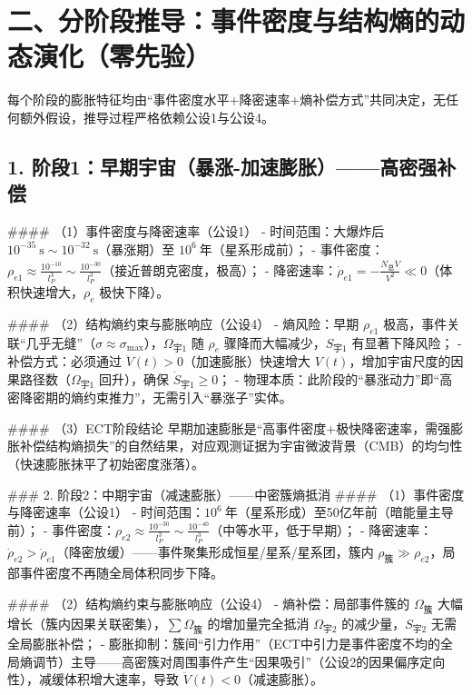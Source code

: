 \documentclass{article}
\begin{document}
\section*{二、分阶段推导：事件密度与结构熵的动态演化（零先验）}
每个阶段的膨胀特征均由“事件密度水平+降密速率+熵补偿方式”共同决定，无任何额外假设，推导过程严格依赖公设1与公设4。

\subsection*{1. 阶段1：早期宇宙（暴涨-加速膨胀）——高密强补偿}
#### （1）事件密度与降密速率（公设1）
- 时间范围：大爆炸后 \( 10^{-35}\ \text{s} \sim 10^{-32}\ \text{s} \)（暴涨期）至 \( 10^6\ \text{年} \)（星系形成前）；
- 事件密度：\( \rho_{e1} \approx \frac{10^{-10}}{l_P^3} \sim \frac{10^{-30}}{l_P^3} \)（接近普朗克密度，极高）；
- 降密速率：\( \dot{\rho}_{e1} = -\frac{N_{\text{总}} \dot{V}}{V^2} \ll 0 \)（体积快速增大，\( \rho_e \) 极快下降）。

#### （2）结构熵约束与膨胀响应（公设4）
- 熵风险：早期 \( \rho_{e1} \) 极高，事件关联“几乎无缝”（\( \sigma \approx \sigma_{\text{max}} \)），\( \Omega_{\text{宇1}} \) 随 \( \rho_e \) 骤降而大幅减少，\( S_{\text{宇1}} \) 有显著下降风险；
- 补偿方式：必须通过 \( \ddot{V}(t) > 0 \)（加速膨胀）快速增大 \( V(t) \)，增加宇宙尺度的因果路径数（\( \Omega_{\text{宇1}} \) 回升），确保 \( \dot{S}_{\text{宇1}} \geq 0 \)；
- 物理本质：此阶段的“暴涨动力”即“高密降密期的熵约束推力”，无需引入“暴涨子”实体。

#### （3）ECT阶段结论
早期加速膨胀是“高事件密度+极快降密速率，需强膨胀补偿结构熵损失”的自然结果，对应观测证据为宇宙微波背景（CMB）的均匀性（快速膨胀抹平了初始密度涨落）。

### 2. 阶段2：中期宇宙（减速膨胀）——中密簇熵抵消
#### （1）事件密度与降密速率（公设1）
- 时间范围：\( 10^6\ \text{年} \)（星系形成）至50亿年前（暗能量主导前）；
- 事件密度：\( \rho_{e2} \approx \frac{10^{-30}}{l_P^3} \sim \frac{10^{-40}}{l_P^3} \)（中等水平，低于早期）；
- 降密速率：\( \dot{\rho}_{e2} > \dot{\rho}_{e1} \)（降密放缓）——事件聚集形成恒星/星系/星系团，簇内 \( \rho_{\text{簇}} \gg \rho_{e2} \)，局部事件密度不再随全局体积同步下降。

#### （2）结构熵约束与膨胀响应（公设4）
- 熵补偿：局部事件簇的 \( \Omega_{\text{簇}} \) 大幅增长（簇内因果关联密集），\( \sum \Omega_{\text{簇}} \) 的增加量完全抵消 \( \Omega_{\text{宇2}} \) 的减少量，\( S_{\text{宇2}} \) 无需全局膨胀补偿；
- 膨胀抑制：簇间“引力作用”（ECT中引力是事件密度不均的全局熵调节）主导——高密簇对周围事件产生“因果吸引”（公设2的因果偏序定向性），减缓体积增大速率，导致 \( \ddot{V}(t) < 0 \)（减速膨胀）。
\end{document}
